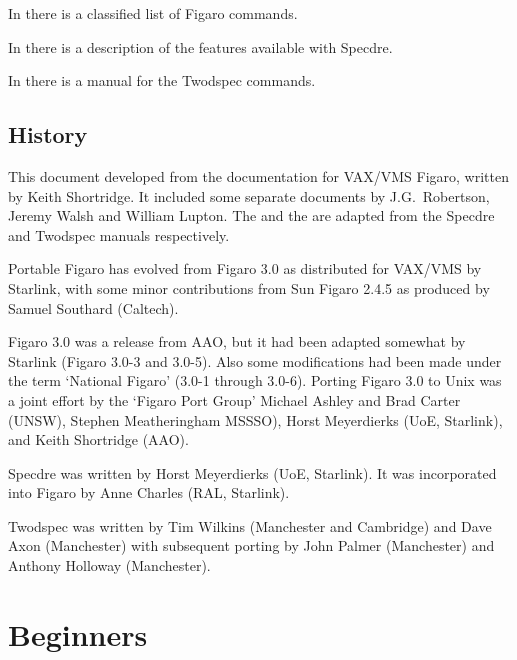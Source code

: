 In 
there is a classified list of Figaro commands.

In 
there is a description of the features available with Specdre.

In 
there is a manual for the Twodspec commands.

\subsection{History}

This document developed from the documentation for VAX/VMS Figaro,
written by Keith Shortridge. It included some separate documents by
J.G.~Robertson, Jeremy Walsh and William Lupton.
{The  and the
}
are adapted from the Specdre and Twodspec manuals respectively.

Portable Figaro has evolved from Figaro 3.0 as distributed for VAX/VMS
by Starlink, with some minor contributions from Sun Figaro 2.4.5 as
produced by Samuel Southard (Caltech).

Figaro 3.0 was a release from AAO, but it had been adapted somewhat
by Starlink (Figaro 3.0-3 and 3.0-5). Also some modifications had
been made under the term `National Figaro' (3.0-1 through 3.0-6).
Porting Figaro 3.0 to Unix was a joint effort by the `Figaro Port
Group' Michael Ashley and Brad Carter (UNSW), Stephen Meatheringham
MSSSO), Horst Meyerdierks (UoE, Starlink), and Keith Shortridge (AAO).

Specdre was written by Horst Meyerdierks (UoE, Starlink).  It was
incorporated into Figaro by Anne Charles (RAL, Starlink).

Twodspec was written by Tim Wilkins (Manchester and Cambridge) and Dave
Axon (Manchester) with subsequent porting by John Palmer (Manchester) and
Anthony Holloway (Manchester).


\newpage %
\section{\label{beginners}Beginners}

